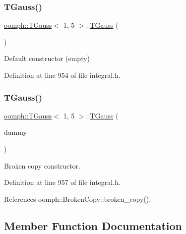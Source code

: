 \subsubsection{\texorpdfstring{T\+Gauss()}{TGauss()}\hspace{0.1cm}{\footnotesize\ttfamily [1/2]}}
{\footnotesize\ttfamily \hyperlink{classoomph_1_1TGauss}{oomph\+::\+T\+Gauss}$<$ 1, 5 $>$\+::\hyperlink{classoomph_1_1TGauss}{T\+Gauss} (\begin{DoxyParamCaption}{ }\end{DoxyParamCaption})\hspace{0.3cm}{\ttfamily [inline]}}



Default constructor (empty) 



Definition at line 954 of file integral.\+h.

\mbox{\label{classoomph_1_1TGauss_3_011_00_015_01_4_af0ec44ac7fa487c56729bd62b7ba2e19}} 
\subsubsection{\texorpdfstring{T\+Gauss()}{TGauss()}\hspace{0.1cm}{\footnotesize\ttfamily [2/2]}}
{\footnotesize\ttfamily \hyperlink{classoomph_1_1TGauss}{oomph\+::\+T\+Gauss}$<$ 1, 5 $>$\+::\hyperlink{classoomph_1_1TGauss}{T\+Gauss} (\begin{DoxyParamCaption}\item[{const \hyperlink{classoomph_1_1TGauss}{T\+Gauss}$<$ 1, 5 $>$ \&}]{dummy }\end{DoxyParamCaption})\hspace{0.3cm}{\ttfamily [inline]}}



Broken copy constructor. 



Definition at line 957 of file integral.\+h.



References oomph\+::\+Broken\+Copy\+::broken\+\_\+copy().



\subsection{Member Function Documentation}
\mbox{\label{classoomph_1_1TGauss_3_011_00_015_01_4_a41f57d5559e2dad23edd5acb359297db}} 
